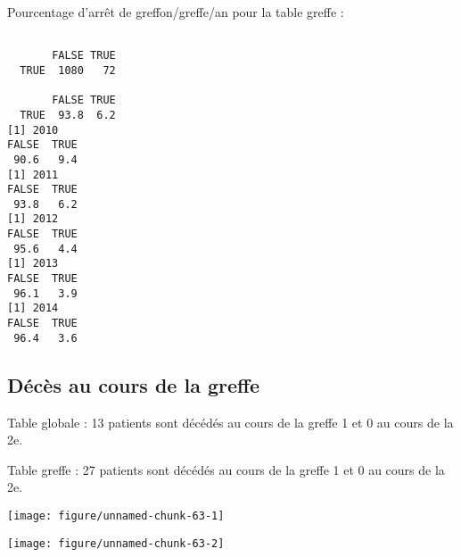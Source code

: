 \documentclass[11pt,a4paper]{article}\usepackage[]{graphicx}\usepackage[]{color}
\makeatletter
\def\maxwidth{ %
  \ifdim\Gin@nat@width>\linewidth
    \linewidth
  \else
    \Gin@nat@width
  \fi
}
\newenvironment{kframe}{%
 \def\at@end@of@kframe{}%
 \ifinner\ifhmode%
  \def\at@end@of@kframe{\end{minipage}}%
  \begin{minipage}{\columnwidth}%
 \fi\fi%
 \def\FrameCommand##1{\hskip\@totalleftmargin \hskip-\fboxsep
 \colorbox{shadecolor}{##1}\hskip-\fboxsep
     \hskip-\linewidth \hskip-\@totalleftmargin \hskip\columnwidth}%
 \MakeFramed {\advance\hsize-\width
   \@totalleftmargin\z@ \linewidth\hsize
   \@setminipage}}%
 {\par\unskip\endMakeFramed%
 \at@end@of@kframe}
\newenvironment{knitrout}{}{} %
\makeatother
\begin{document}
Pourcentage d'arrêt de greffon/greffe/an pour la table greffe :

\begin{knitrout}
\color{fgcolor}\begin{kframe}
\begin{verbatim}
      
       FALSE TRUE
  TRUE  1080   72
      
       FALSE TRUE
  TRUE  93.8  6.2
[1] 2010
FALSE  TRUE 
 90.6   9.4 
[1] 2011
FALSE  TRUE 
 93.8   6.2 
[1] 2012
FALSE  TRUE 
 95.6   4.4 
[1] 2013
FALSE  TRUE 
 96.1   3.9 
[1] 2014
FALSE  TRUE 
 96.4   3.6 
\end{verbatim}
\end{kframe}
\end{knitrout}

  \subsection{Décès au cours de la greffe}

Table globale : 13 patients sont décédés au cours de la greffe 1 et 0 au cours de la 2e.

Table greffe : 27 patients sont décédés au cours de la greffe 1 et 0 au cours de la 2e.

\begin{knitrout}
\color{fgcolor}
\texttt{[image: figure/unnamed-chunk-63-1]} 

\texttt{[image: figure/unnamed-chunk-63-2]} 

\end{knitrout}
\end{document}
